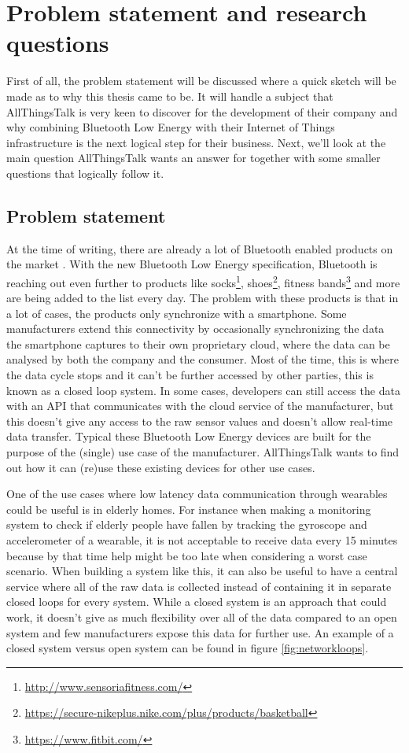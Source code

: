 \documentclass[pdftex,a4paper,12pt,twoside]{report}
\begin{document}
\newpage{}
\section{Problem statement and research questions}
\label{sec:problemdefinition}
First of all, the problem statement will be discussed where a quick sketch will be made as to why this thesis came to be. It will handle a subject that AllThingsTalk is very keen to discover for the development of their company and why combining Bluetooth Low Energy with their Internet of Things infrastructure is the next logical step for their business. Next, we'll look at the main question AllThingsTalk wants an answer for together with some smaller questions that logically follow it.

\subsection{Problem statement}
\label{subsec:problemstatement}
At the time of writing, there are already a lot of Bluetooth enabled products on the  market \citep{gartner2015}. With the new Bluetooth Low Energy specification, Bluetooth is reaching out even further to products like socks\footnote{\url{http://www.sensoriafitness.com/}}, shoes\footnote{\url{https://secure-nikeplus.nike.com/plus/products/basketball}}, fitness bands\footnote{\url{https://www.fitbit.com/}} and more are being added to the list every day. The problem with these products is that in a lot of cases, the products only synchronize with a smartphone. Some manufacturers extend this connectivity by occasionally synchronizing the data the smartphone captures to their own proprietary cloud, where the data can be analysed by both the company and the consumer. Most of the time, this is where the data cycle stops and it can't be further accessed by other parties, this is known as a closed loop system. In some cases, developers can still access the data with an API that communicates with the cloud service of the manufacturer, but this doesn't give any access to the raw sensor values and doesn't allow real-time data transfer. Typical these Bluetooth Low Energy devices are built for the purpose of the (single) use case of the manufacturer. AllThingsTalk wants to find out how it can (re)use these existing devices for other use cases.

One of the use cases where low latency data communication through wearables could be useful is in elderly homes. For instance when making a monitoring system to check if elderly people have fallen by tracking the gyroscope and accelerometer of a wearable, it is not acceptable to receive data every 15 minutes because by that time help might be too late when considering a worst case scenario. When building a system like this, it can also be useful to have a central service where all of the raw data is collected instead of containing it in separate closed loops for every system. While a closed system is an approach that could work, it doesn't give as much flexibility over all of the data compared to an open system and few manufacturers expose this data for further use. An example of a closed system versus open system can be found in figure \ref{fig:networkloops}.
\end{document}
